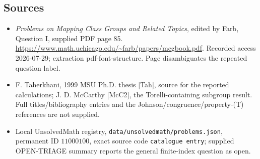 \documentclass[11pt]{article}
\begin{document}
\subsection{Sources}
\begin{itemize}
\item \emph{Problems on Mapping Class Groups and Related Topics}, edited by Farb, Question I, supplied PDF page 85. \url{https://www.math.uchicago.edu/~farb/papers/mcgbook.pdf}. Recorded access 2026-07-29; extraction pdf-font-structure. Page disambiguates the repeated question label.
\item F. Taherkhani, 1999 MSU Ph.D. thesis [Tah], source for the reported calculations; J. D. McCarthy [McC2], the Torelli-containing subgroup result. Full titles/bibliography entries and the Johnson/congruence/property-(T) references are not supplied.
\item Local UnsolvedMath registry, \texttt{data/unsolvedmath/problems.json}, permanent ID \(11000100\), exact source code \texttt{catalogue entry}; supplied OPEN-TRIAGE summary reports the general finite-index question as open.
\end{itemize}
\end{document}
